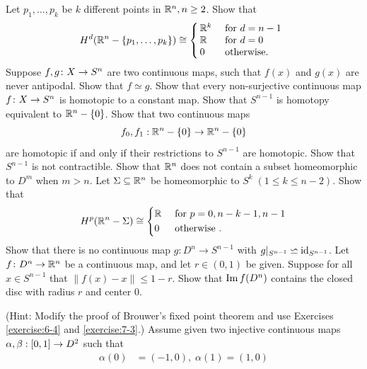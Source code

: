\begin{enumerate}[\theexercise.1]
  \NewItem Let ${p}_{1},\ldots,{p}_{k}$ be $k$ different points in ${\mathbb{R}}^{n},n \geq  2$. Show that
    \[
      {H}^{d}( {{\mathbb{R}}^{n}- \left\{  {{p}_{1},\ldots,{p}_{k}}\right\}  })  \cong  \left\{\!\!\begin{array}{ll} {\ensuremath{\mathbb{R}}}^{k} & \text{ for }d = n- 1 \\  \mathbb{R} & \text{ for }d = 0 \\  0 & \text{ otherwise. } \end{array}\right.
    \]
  \NewItem Suppose $f,g\colon X \rightarrow  {S}^{n}$ are two continuous maps, such that $f( x)$ and $g( x)$ are never antipodal. Show that $f \simeq  g$.
    Show that every non-surjective continuous map $f\colon X \rightarrow  {S}^{n}$ is homotopic to a constant map.
  \NewItem Show that ${S}^{n- 1}$ is homotopy equivalent to ${{\mathbb{R}}}^{n}- \{ 0\}$. Show that two continuous maps
    \[
      {f}_{0},{f}_{1} : {\mathbb{R}}^{n}- \{ 0\}  \rightarrow  {\ensuremath{\mathbb{R}}}^{n}- \{ 0\}
    \]
    are homotopic if and only if their restrictions to ${S}^{n- 1}$ are homotopic.
  \NewItem Show that ${S}^{n- 1}$ is not contractible.
  \newchap[7]
  \NewItem Show that ${\mathbb{R}}^n$ does not contain a subset homeomorphic to $D^m$ when $m > n$.
  \NewItem Let $\Sigma\subseteq{\ensuremath{\mathbb{R}}}^n$ be homeomorphic
    to $S^k\; (1\le k\le n-2)$. Show that
    \begin{align*}
      H^p({\mathbb{R}}^n-\Sigma) \cong \left\{\begin{aligned}
                                        & {\mathbb{R}} &  & \text{ for } p=0, n-k-1, n-1 \\
                                        & 0   &  & \text{ otherwise }.
                                      \end{aligned}\right.
    \end{align*}
  \NewItem Show that there is no continuous map $g:D^n\to S^{n-1}$ with $g|_{S^{n-1}}\backsimeq \operatorname{id}_{S^{n-1}}$.
  \NewItem Let $f\colon {D}^{n} \rightarrow  {\ensuremath{\mathbb{R}}}^{n}$ be a continuous map, and let $r \in  ( {0,1})$ be given. Suppose for all $x \in  {S}^{n- 1}$ that $\| f( x) - x\|  \leq  1- r$. Show that $\operatorname{Im} f( {D}^{n})$ contains the closed disc with radius $r$ and center 0.\par
    \par(Hint: Modify the proof of Brouwer's fixed point theorem and use Exercises \ref{exercise:6-4} and \ref{exercise:7-3}.)
  \NewItem Assume given two injective continuous maps $\alpha,\beta  : [  {0,1}]   \rightarrow  {D}^{2}$ such that
    \[
    \begin{aligned}
      \alpha ( 0)  & = ( {-1,0}),\;\alpha ( 1)  = ( {1,0}) \\

\end{aligned}\]
\end{enumerate}
